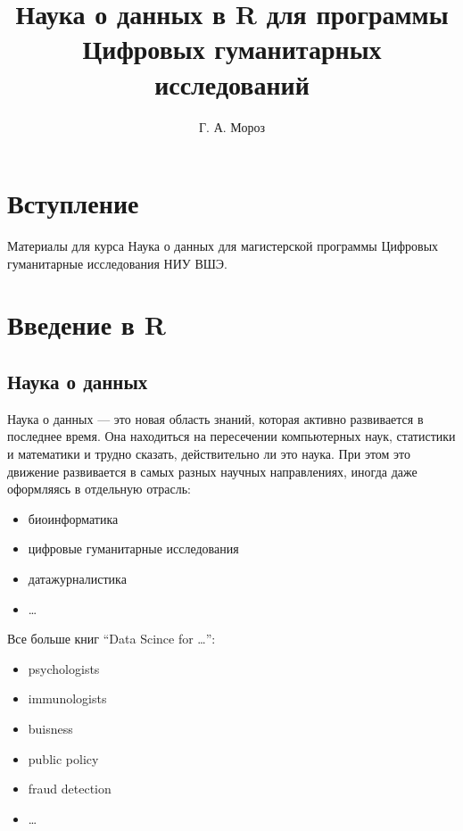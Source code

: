 \documentclass[]{book}
\title{Наука о данных в R для программы Цифровых гуманитарных исследований}
\author{Г. А. Мороз}
\date{}
\providecommand{\tightlist}{%
  \setlength{\itemsep}{0pt}\setlength{\parskip}{0pt}}
\begin{document}
\maketitle

{
\setcounter{tocdepth}{1}
\tableofcontents
}
\hypertarget{section}{%
\chapter{Вступление}\label{section}}

Материалы для курса Наука о данных для магистерской программы Цифровых гуманитарные исследования НИУ ВШЭ.

\hypertarget{intro}{%
\chapter{Введение в R}\label{intro}}

\hypertarget{section-1}{%
\section{Наука о данных}\label{section-1}}

Наука о данных --- это новая область знаний, которая активно развивается в последнее время. Она находиться на пересечении компьютерных наук, статистики и математики и трудно сказать, действительно ли это наука. При этом это движение развивается в самых разных научных направлениях, иногда даже оформляясь в отдельную отрасль:

\begin{itemize}
\tightlist
\item
  биоинформатика
\item
  цифровые гуманитарные исследования
\item
  датажурналистика
\item
  \ldots{}
\end{itemize}

Все больше книг ``Data Scince for \ldots{}'':

\begin{itemize}
\tightlist
\item
  psychologists \citep{hansjoerg19}
\item
  immunologists \citep{thomas19}
\item
  buisness \citep{provost13}
\item
  public policy \citep{brooks13}
\item
  fraud detection \citep{baesens15}
\item
  \ldots{}
\end{itemize}
\end{document}
